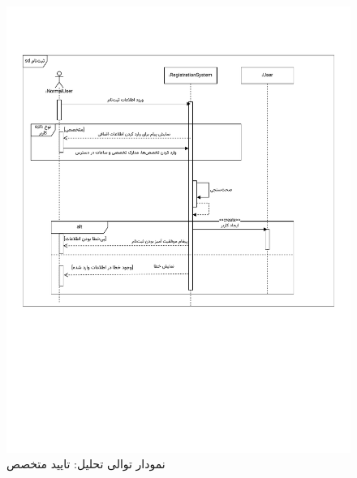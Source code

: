 \begin{figure}[ht!]
	\centering
	\includegraphics[scale=0.8, page=6]{figs/OOD-Sequence-1.pdf}
	\caption{نمودار توالی تحلیل: تایید متخصص}
\end{figure}
\FloatBarrier
\newpage

